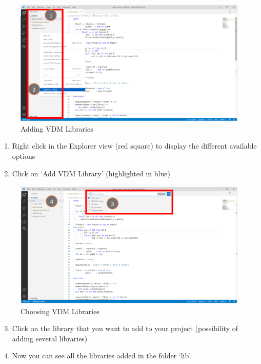 \documentclass{overturerepchap}
\begin{document}
\begin{figure}[!htb]
	\begin{center}
	  \includegraphics[scale=0.65]{snapshots/Add VDM library.png}
	  \caption[Adding VDM Libraries]{Adding VDM Libraries}
	  \label{fig:NewLibraries}
	\end{center}
\end{figure}

\begin{enumerate}
    \item Right click in the Explorer view (red square) to display the different available options
    \item Click on ‘Add VDM Library’ (highlighted in blue)
\end{enumerate}
\newpage
\begin{figure}[!htb]
	\begin{center}
	  \includegraphics[scale=0.65]{snapshots/Choose the library.png}
	  \caption[Adding VDM Libraries]{Choosing VDM Libraries}
	  \label{fig:ChoosingLibrairies}
	\end{center}
\end{figure}
\begin{enumerate}
  \setcounter{enumi}{2}
    \item  Click on the library that you want to add to your project (possibility of adding several libraries)
    \item Now you can see all the libraries added in the folder ‘lib’.
\end{enumerate}
\end{document}
